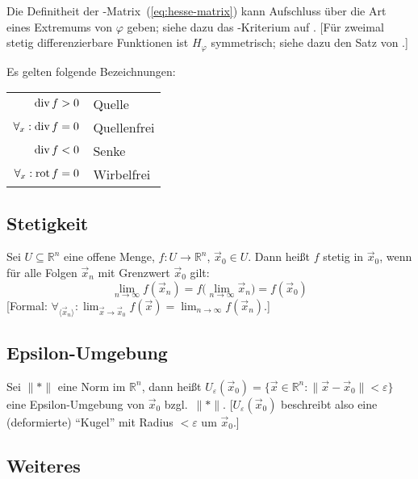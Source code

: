 Die Definitheit der -Matrix~(\cref{eq:hesse-matrix}) kann Aufschluss über die Art eines Extremums von $\varphi$ geben; siehe dazu das -Kriterium auf .
[Für zweimal stetig differenzierbare Funktionen ist $H_\varphi$ symmetrisch; siehe dazu den Satz von .]

Es gelten folgende Bezeichnungen:
\begin{center}
\begin{tabular}{rl}
	            $\operatorname{div} f > 0$ & Quelle      \\
	$\forall_x : \operatorname{div} f = 0$ & Quellenfrei \\
	            $\operatorname{div} f < 0$ & Senke       \\
	 $\forall_x : \operatorname{rot} f = 0$ & Wirbelfrei
\end{tabular}
\end{center}


\subsection{Stetigkeit}

Sei $U\subseteq\mathbb{R}^n$ eine offene Menge, $f : U\to\mathbb{R}^n$, $\vec x_0 \in U$.
Dann heißt $f$ stetig in $\vec x_0$, wenn für alle Folgen $\vec x_n$ mit Grenzwert $\vec x_0$ gilt:
\[ \lim_{n\to\infty} f(\vec x_n) = f\bigl(\lim_{n\to\infty} \vec x_n\bigr) = f(\vec x_0) \]
[Formal: $\forall_{\langle \vec x_n \rangle} : \lim_{\vec x \to \vec x_0} f(\vec x) = \lim_{n\to\infty} f(\vec x_n)$.]


\subsection{\label{sub:Epsilon-Umgebung}Epsilon-Umgebung}

Sei $\lVert * \rVert$ eine Norm im $\mathbb{R}^n$, dann heißt $U_\varepsilon(\vec x_0) = \{ \vec x \in \mathbb{R}^n : \lVert \vec x-\vec x_0 \rVert < \varepsilon \}$ eine Epsilon-Umgebung von $\vec x_0$ bzgl.~$\lVert*\rVert$. [$U_\varepsilon(\vec x_0)$ beschreibt also eine (deformierte) \enquote{Kugel} mit Radius $<\varepsilon$ um $\vec x_0$.]


\subsection{Weiteres}

